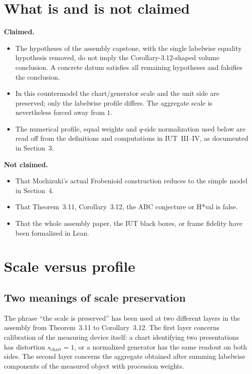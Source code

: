\documentclass[11pt]{article}
\theoremstyle{definition}
\begin{document}
\section*{What is and is not claimed}

\textbf{Claimed.}
\begin{itemize}[leftmargin=*]
\item The hypotheses of the assembly capstone, with the single
labelwise equality hypothesis removed, do not imply the
Corollary-3.12-shaped volume conclusion.  A concrete datum
satisfies all remaining hypotheses and falsifies the conclusion.
\item In this countermodel the chart/generator scale and the unit
side are preserved; only the labelwise profile differs.  The
aggregate scale is nevertheless forced away from $1$.
\item The numerical profile, equal weights and $q$-side
normalization used below are read off from the definitions and
computations in IUT~III--IV, as documented in Section~3.
\end{itemize}

\textbf{Not claimed.}
\begin{itemize}[leftmargin=*]
\item That Mochizuki's actual Frobenioid construction reduces to
the simple model in Section~4.
\item That Theorem~3.11, Corollary~3.12, the ABC conjecture or
H*val is false.
\item That the whole assembly paper, the IUT black boxes, or frame
fidelity have been formalized in Lean.
\end{itemize}

\section{Scale versus profile}

\subsection{Two meanings of scale preservation}

The phrase ``the scale is preserved'' has been used at two
different layers in the assembly from Theorem~3.11 to
Corollary~3.12.  The first layer concerns calibration of the
measuring device itself: a chart identifying two presentations has
distortion $s_{\mathrm{chart}}=1$, or a normalized generator has
the same readout on both sides.  The second layer concerns the
aggregate obtained after summing labelwise components of the
measured object with procession weights.
\end{document}
